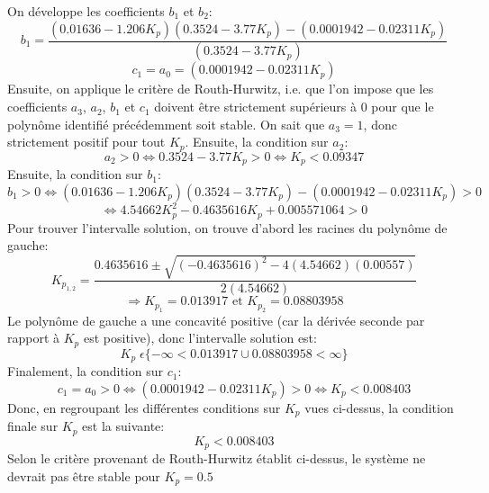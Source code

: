 \documentclass[11pt, a4paper]{article}
\begin{document}
On développe les coefficients $b_1$ et $b_2$: 
$$b_1=\frac{(0.01636-1.206K_p)(0.3524-3.77K_p)-(0.0001942-0.02311K_p)}{(0.3524-3.77K_p)}$$
$$c_1=a_0=(0.0001942-0.02311K_p)$$
Ensuite, on applique le critère de Routh-Hurwitz, i.e. que l'on impose que les coefficients $a_3$, $a_2$, $b_1$ et $c_1$ doivent être strictement supérieurs à 0 pour que le polynôme identifié précédemment soit stable. On sait que $a_3=1$, donc strictement positif pour tout $K_p$. Ensuite, la condition sur $a_2$:
$$a_2 > 0 \Leftrightarrow 0.3524-3.77K_p > 0 \Leftrightarrow \boxed{K_p < 0.09347}$$
Ensuite, la condition sur $b_1$:
$$b_1 > 0 \Leftrightarrow (0.01636-1.206K_p)(0.3524-3.77K_p)-(0.0001942-0.02311K_p) > 0$$
$$\Leftrightarrow 4.54662K_p^2-0.4635616K_p+0.005571064 > 0$$
Pour trouver l'intervalle solution, on trouve d'abord les racines du polynôme de gauche:
$$K_{p_{1,2}}=\frac{0.4635616\pm \sqrt{(-0.4635616)^2-4(4.54662)(0.00557)}}{2(4.54662)}$$ $$\Rightarrow K_{p_1}=0.013917 \text{ et } K_{p_2}=0.08803958$$ 
Le polynôme de gauche a une concavité positive (car la dérivée seconde par rapport à $K_p$ est positive), donc l'intervalle solution est:
$$\boxed{K_p \; \epsilon \{-\infty < 0.013917 \cup 0.08803958 < \infty \}}$$
Finalement, la condition sur $c_1$:
$$c_1 = a_0 > 0 \Leftrightarrow (0.0001942-0.02311K_p)>0 \Leftrightarrow \boxed{K_p < 0.008403}$$
Donc, en regroupant les différentes conditions sur $K_p$ vues ci-dessus, la condition finale sur $K_p$ est la suivante:
$$\boxed{K_p < 0.008403}$$
Selon le critère provenant de Routh-Hurwitz établit ci-dessus, le système ne devrait pas être stable pour $K_p=0.5$
\end{document}
